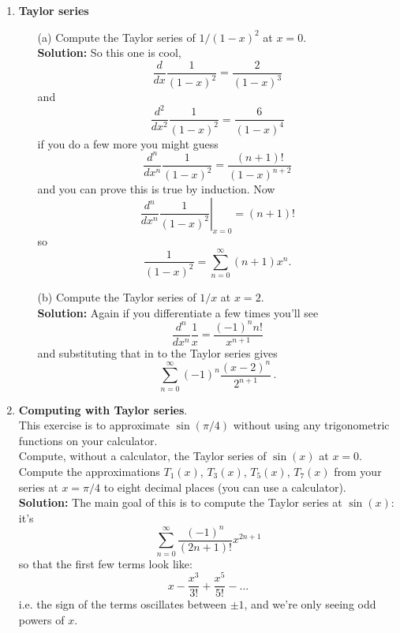 \documentclass[11pt,a4paper]{scrartcl}
\begin{document}
\begin{enumerate}
	\item \textbf{Taylor series}
	\begin{itemize}
		\item[(a)] Compute the Taylor series of $1/(1-x)^2$ at $x=0$.\\
        \textbf{Solution: } So this one is cool,
          \begin{equation}
            \frac{d}{dx}\frac{1}{(1-x)^2}=\frac{2}{(1-x)^3}
          \end{equation}
          and
          \begin{equation}
            \frac{d^2}{dx^2}\frac{1}{(1-x)^2}=\frac{6}{(1-x)^4}
          \end{equation}
          if you do a few more you might guess
          \begin{equation}
            \frac{d^n}{dx^n}\frac{1}{(1-x)^2}=\frac{(n+1)!}{(1-x)^{n+2}}
          \end{equation}
          and you can prove this is true by induction. Now
          \begin{equation}
            \left.\frac{d^n}{dx^n}\frac{1}{(1-x)^2}\right|_{x=0}=(n+1)!
          \end{equation}
          so
          \begin{equation}
            \frac{1}{(1-x)^2}=\sum_{n=0}^{\infty} (n+1)x^n.
          \end{equation}
       
		\item[(b)] Compute the Taylor series of $1/x$ at $x=2$. \\
        \textbf{Solution: } Again if you differentiate a few times you'll see
            \begin{equation}
              \frac{d^n}{dx^n}\frac{1}{x}=\frac{(-1)^nn!}{x^{n+1}}
            \end{equation}
            and substituting that in to the Taylor series gives
            \begin{equation}
            \sum_{n=0}^{\infty} (-1)^n \frac{(x-2)^n}{2^{n+1}}\,.
            \end{equation}

	\end{itemize}


	\item \textbf{Computing with Taylor series}.\\
	This exercise is to approximate $\sin(\pi/4)$ without 
	using any trigonometric functions on your calculator.\\
    Compute, without a calculator, 
 	the Taylor series of
		$\sin (x)$ at $x=0$.
\\
		Compute the approximations $T_1(x)$, $T_3(x)$, $T_5(x)$, $T_7(x)$ from your
		series at $x = \pi/4$ to eight decimal places (you can use a calculator).\\
    \textbf{Solution: }
    The main goal of this is to compute the Taylor series at $\sin(x)$: it's
    \[
    \sum_{n=0}^{\infty}\frac{(-1)^n}{(2n+1)!}x^{2n+1}
    \]
    so that the first few terms look like:
    \[
    x-\frac{x^3}{3!}+ \frac{x^5}{5!} - \dots
    \]
    i.e. the sign of the terms oscillates between $\pm1$, and we're only seeing odd powers of $x$. 


\end{enumerate}
\end{document}
